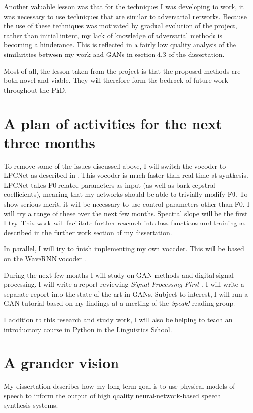 \documentclass[11pt,a4paper]{article}
\begin{document}
Another valuable lesson was that for the techniques I was developing to work, it was necessary to use techniques that are similar to adversarial networks. Because the use of these techniques was motivated by gradual evolution of the project, rather than initial intent, my lack of knowledge of adversarial methods is becoming a hinderance. This is reflected in a fairly low quality analysis of the similarities between my work and GANs in section 4.3 of the dissertation.

Most of all, the lesson taken from the project is that the proposed methods are both novel and viable. They will therefore form the bedrock of future work throughout the PhD.

\section{A plan of activities for the next three months}

To remove some of the issues discussed above, I will switch the vocoder to LPCNet as described in \cite{lpcnet}. This vocoder is much faster than real time at synthesis. LPCNet takes F0 related parameters as input (as well as bark cepstral coefficients), meaning that my networks should be able to trivially modify F0. To show serious merit, it will be necessary to use control parameters other than F0. I will try a range of these over the next few months. Spectral slope will be the first I try. This work will facilitate further research into loss functions and training as described in the further work section of my dissertation.

In parallel, I will try to finish implementing my own vocoder. This will be based on the WaveRNN vocoder \citep{pmlr-v80-kalchbrenner18a}.

During the next few months I will study on GAN methods and digital signal processing. I will write a report reviewing \emph{Signal Processing First} \citep{McClellan:2007:DF:1205272}. I will write a separate report into the state of the art in GANs. Subject to interest, I will run a GAN tutorial based on my findings at a meeting of the \emph{Speak!} reading group.

I addition to this research and study work, I will also be helping to teach an introductory course in Python in the Linguistics School.

\section{A grander vision}

My dissertation describes how my long term goal is to use physical models of speech to inform the output of high quality neural-network-based speech synthesis systems.



\end{document}
